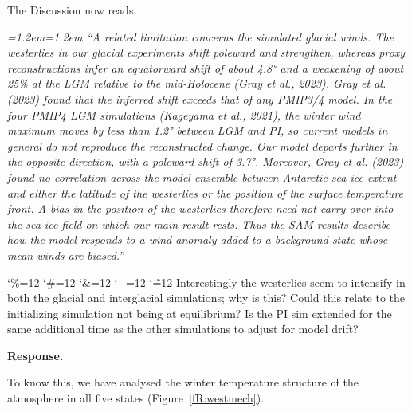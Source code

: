 \documentclass[11pt,a4paper]{article}
\newcommand{\comment}[1]{\par\medskip\noindent\color{black}\begingroup\catcode`\%=12 \catcode`\#=12 \catcode`\&=12 \catcode`\_=12 \catcode`\~=12 \commentbody}
\newcommand{\commentbody}[1]{#1\endgroup\par\smallskip}
\newcommand{\response}{\par\noindent\color{chgcol}\textbf{Response.}\ }
\newenvironment{change}{\par\smallskip\color{chgcol}\small\itshape\leftskip=1.2em\rightskip=1.2em\noindent\ignorespaces}{\par\smallskip}
\begin{document}
The Discussion now reads:

\begin{change}
``A related limitation concerns the simulated glacial winds. The westerlies in our glacial experiments shift poleward and strengthen, whereas proxy reconstructions infer an equatorward shift of about 4.8° and a weakening of about 25\% at the LGM relative to the mid-Holocene (Gray et al., 2023). Gray et al. (2023) found that the inferred shift exceeds that of any PMIP3/4 model. In the four PMIP4 LGM simulations (Kageyama et al., 2021), the winter wind maximum moves by less than 1.2° between LGM and PI, so current models in general do not reproduce the reconstructed change. Our model departs further in the opposite direction, with a poleward shift of 3.7°. Moreover, Gray et al. (2023) found no correlation across the model ensemble between Antarctic sea ice extent and either the latitude of the westerlies or the position of the surface temperature front. A bias in the position of the westerlies therefore need not carry over into the sea ice field on which our main result rests. Thus the SAM results describe how the model responds to a wind anomaly added to a background state whose mean winds are biased.''
\end{change} %

\comment{R3}{Interestingly the westerlies seem to intensify in both the glacial and interglacial simulations; why is this? Could this relate to the initializing simulation not being at equilibrium? Is the PI sim extended for the same additional time as the other simulations to adjust for model drift?}

\response

To know this, we have analysed the winter temperature structure of the atmosphere in all five states (Figure~\ref{fR:westmech}).
\end{document}
